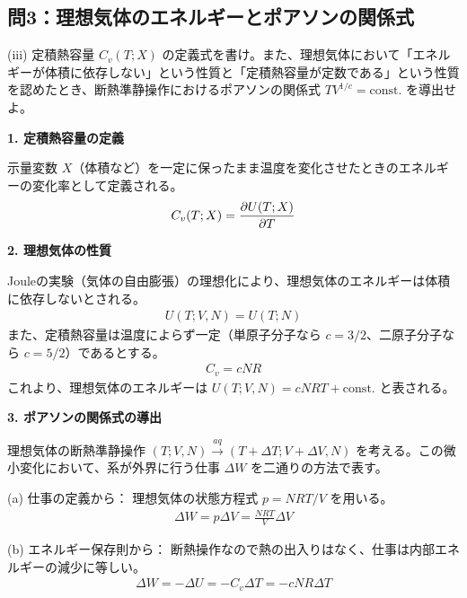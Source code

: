 \documentclass[a4paper,12pt]{jlreq}
\begin{document}
\vspace{10mm}

\subsection*{問3：理想気体のエネルギーとポアソンの関係式}

\begin{itembox}[l]{(iii)}
  定積熱容量 $C_v(T; X)$ の定義式を書け。また、理想気体において「エネルギーが体積に依存しない」という性質と「定積熱容量が定数である」という性質を認めたとき、断熱準静操作におけるポアソンの関係式 $TV^{1/c} = \text{const.}$ を導出せよ。
\end{itembox}

\vspace{5mm}

\par
\textbf{1. 定積熱容量の定義} \par
示量変数 $X$（体積など）を一定に保ったまま温度を変化させたときのエネルギーの変化率として定義される。
\begin{align}
  C_v(T; X) = \pdv{U(T; X)}{T}
\end{align}

\textbf{2. 理想気体の性質} \par
Jouleの実験（気体の自由膨張）の理想化により、理想気体のエネルギーは体積に依存しないとされる。
\begin{align}
  U(T; V, N) = U(T; N)
\end{align}
また、定積熱容量は温度によらず一定（単原子分子なら $c=3/2$、二原子分子なら $c=5/2$）であるとする。
\begin{align}
  C_v = cNR
\end{align}
これより、理想気体のエネルギーは $U(T; V, N) = cNRT + \text{const.}$ と表される。

\textbf{3. ポアソンの関係式の導出} \par
理想気体の断熱準静操作 $(T; V, N) \xrightarrow{aq} (T+\Delta T; V+\Delta V, N)$ を考える。この微小変化において、系が外界に行う仕事 $\Delta W$ を二通りの方法で表す。

(a) 仕事の定義から：
理想気体の状態方程式 $p = NRT/V$ を用いる。
\begin{align}
  \Delta W = p \Delta V = \frac{NRT}{V} \Delta V
\end{align}

(b) エネルギー保存則から：
断熱操作なので熱の出入りはなく、仕事は内部エネルギーの減少に等しい。
\begin{align}
  \Delta W = -\Delta U = -C_v \Delta T = -cNR \Delta T
\end{align}
\end{document}
